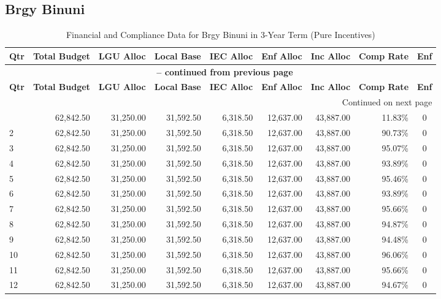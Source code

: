 \subsection{Brgy Binuni}
\begin{longtable}{lrrrrrrrc}
\caption{Financial and Compliance Data for Brgy Binuni in 3-Year Term (Pure Incentives)} \\
\toprule
\textbf{Qtr} & \textbf{Total Budget} & \textbf{LGU Alloc} & \textbf{Local Base} & \textbf{IEC Alloc} & \textbf{Enf Alloc} & \textbf{Inc Alloc} & \textbf{Comp Rate} & \textbf{Enf} \\
\midrule
\endfirsthead
\multicolumn{9}{c}{{\bfseries \tablename\ \thetable{} -- continued from previous page}} \\
\toprule
\textbf{Qtr} & \textbf{Total Budget} & \textbf{LGU Alloc} & \textbf{Local Base} & \textbf{IEC Alloc} & \textbf{Enf Alloc} & \textbf{Inc Alloc} & \textbf{Comp Rate} & \textbf{Enf} \\
\midrule
\endhead
\hline \multicolumn{9}{r}{{Continued on next page}} \\ \hline
\endfoot
\bottomrule
\endlastfoot
1 & 62,842.50 & 31,250.00 & 31,592.50 & 6,318.50 & 12,637.00 & 43,887.00 & 11.83\% & 0 \\
2 & 62,842.50 & 31,250.00 & 31,592.50 & 6,318.50 & 12,637.00 & 43,887.00 & 90.73\% & 0 \\
3 & 62,842.50 & 31,250.00 & 31,592.50 & 6,318.50 & 12,637.00 & 43,887.00 & 95.07\% & 0 \\
4 & 62,842.50 & 31,250.00 & 31,592.50 & 6,318.50 & 12,637.00 & 43,887.00 & 93.89\% & 0 \\
5 & 62,842.50 & 31,250.00 & 31,592.50 & 6,318.50 & 12,637.00 & 43,887.00 & 95.46\% & 0 \\
6 & 62,842.50 & 31,250.00 & 31,592.50 & 6,318.50 & 12,637.00 & 43,887.00 & 93.89\% & 0 \\
7 & 62,842.50 & 31,250.00 & 31,592.50 & 6,318.50 & 12,637.00 & 43,887.00 & 95.66\% & 0 \\
8 & 62,842.50 & 31,250.00 & 31,592.50 & 6,318.50 & 12,637.00 & 43,887.00 & 94.87\% & 0 \\
9 & 62,842.50 & 31,250.00 & 31,592.50 & 6,318.50 & 12,637.00 & 43,887.00 & 94.48\% & 0 \\
10 & 62,842.50 & 31,250.00 & 31,592.50 & 6,318.50 & 12,637.00 & 43,887.00 & 96.06\% & 0 \\
11 & 62,842.50 & 31,250.00 & 31,592.50 & 6,318.50 & 12,637.00 & 43,887.00 & 95.66\% & 0 \\
12 & 62,842.50 & 31,250.00 & 31,592.50 & 6,318.50 & 12,637.00 & 43,887.00 & 94.67\% & 0 \\
\end{longtable}
\newpage
